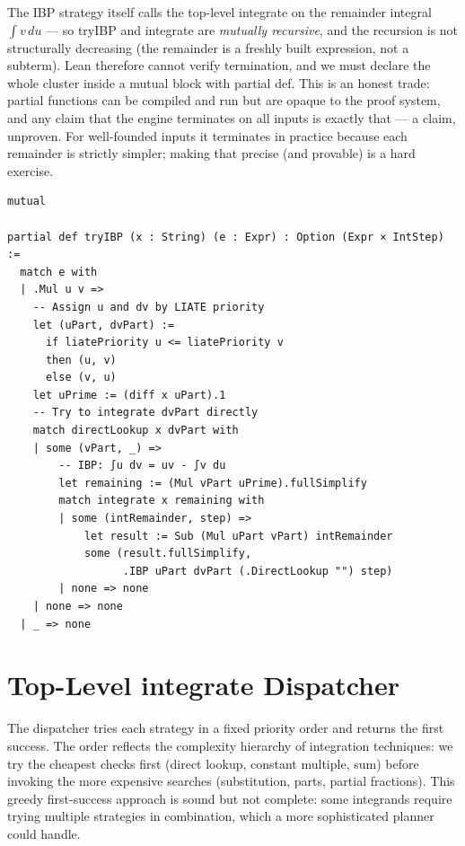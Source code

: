 \documentclass[12pt, openany]{book}
\theoremstyle{plain}
\theoremstyle{definition}
\theoremstyle{remark}
\newcommand{\li}[1]{{\ttfamily\small\color{tealaccent}#1}}
\begin{document}
The IBP strategy itself calls the top-level \li{integrate} on the remainder
integral $\int v\,du$ --- so \li{tryIBP} and \li{integrate} are \emph{mutually
recursive}, and the recursion is not structurally decreasing (the remainder is a
freshly built expression, not a subterm).  Lean therefore cannot verify
termination, and we must declare the whole cluster inside a \li{mutual} block
with \li{partial def}.  This is an honest trade: \li{partial} functions can be
compiled and run but are opaque to the proof system, and any claim that the
engine terminates on all inputs is exactly that --- a claim, unproven.  For
well-founded inputs it terminates in practice because each remainder is
strictly simpler; making that precise (and provable) is a hard exercise.

\begin{leanbox}
\begin{lstlisting}
mutual

partial def tryIBP (x : String) (e : Expr) : Option (Expr × IntStep) :=
  match e with
  | .Mul u v =>
    -- Assign u and dv by LIATE priority
    let (uPart, dvPart) :=
      if liatePriority u <= liatePriority v
      then (u, v)
      else (v, u)
    let uPrime := (diff x uPart).1
    -- Try to integrate dvPart directly
    match directLookup x dvPart with
    | some (vPart, _) =>
        -- IBP: ∫u dv = uv - ∫v du
        let remaining := (Mul vPart uPrime).fullSimplify
        match integrate x remaining with
        | some (intRemainder, step) =>
            let result := Sub (Mul uPart vPart) intRemainder
            some (result.fullSimplify,
                  .IBP uPart dvPart (.DirectLookup "") step)
        | none => none
    | none => none
  | _ => none
\end{lstlisting}
\end{leanbox}
\color{black}

\section{Top-Level \li{integrate} Dispatcher}

The dispatcher tries each strategy in a fixed priority order and returns the first success.  The order reflects the complexity hierarchy of integration techniques: we try the cheapest checks first (direct lookup, constant multiple, sum) before invoking the more expensive searches (substitution, parts, partial fractions).  This greedy first-success approach is sound but not complete: some integrands require trying multiple strategies in combination, which a more sophisticated planner could handle.
\end{document}
